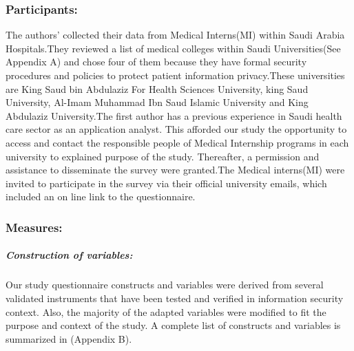\subsubsection{Participants:}
The authors' collected their data from Medical Interns(MI) within Saudi Arabia Hospitals.They reviewed a list of medical colleges within Saudi Universities(See Appendix A) and chose four of them because they have formal security procedures and policies to protect patient information privacy.These universities are King Saud bin Abdulaziz For Health Sciences University, king Saud University, Al-Imam Muhammad Ibn Saud Islamic University and King Abdulaziz University.The first author has a previous experience in Saudi health care sector as an application analyst. This afforded our study the opportunity to access and contact the responsible people of Medical Internship programs in each university to explained purpose of the study. Thereafter, a permission and assistance to disseminate the survey were granted.The Medical interns(MI) were invited to participate in the survey via their official university emails, which included an on line link to the questionnaire. 
\\
\subsubsection{Measures:}
\subparagraph{Construction of variables:} Our study questionnaire constructs and variables were derived from several validated instruments that have been tested and verified in information security context. Also, the majority of the adapted  variables were modified to fit the purpose and context of the study. A complete list of constructs and variables is summarized in (Appendix B).

